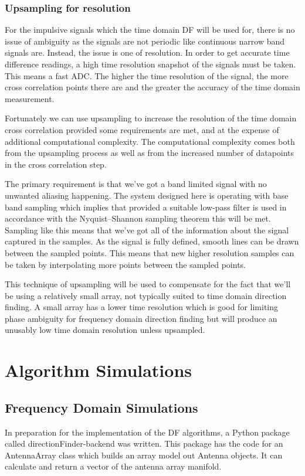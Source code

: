 \subsubsection{Upsampling for resolution}
For the impulsive signals which the time domain DF will be used for, there is no issue of ambiguity as the signals are not periodic like continuous narrow band signals are. Instead, the issue is one of resolution. In order to get accurate time difference readings, a high time resolution snapshot of the signals must be taken. This means a fast ADC. The higher the time resolution of the signal, the more cross correlation points there are and the greater the accuracy of the time domain measurement.

Fortunately we can use upsampling to increase the resolution of the time domain cross correlation provided some requirements are met, and at the expense of additional computational complexity. The computational complexity comes both from the upsampling process as well as from the increased number of datapoints in the cross correlation step.

The primary requirement is that we've got a band limited signal with no unwanted aliasing happening. The system designed here is operating with base band sampling which implies that provided a suitable low-pass filter is used in accordance with the Nyquist–Shannon sampling theorem this will be met. Sampling like this means that we've got all of the information about the signal captured in the samples. As the signal is fully defined, smooth lines can be drawn between the sampled points. This means that new higher resolution samples can be taken by interpolating more points between the sampled points.

This technique of upsampling will be used to compensate for the fact that we'll be using a relatively small array, not typically suited to time domain direction finding. A small array has a lower time resolution which is good for limiting phase ambiguity for frequency domain direction finding but will produce an unusably low time domain resolution unless upsampled.

\section{Algorithm Simulations}
\subsection{Frequency Domain Simulations}
In preparation for the implementation of the DF algorithms, a Python package called directionFinder-backend was written. This package has the code for an AntennaArray class which builds an array model out Antenna objects. It can calculate and return a vector of the antenna array manifold.

